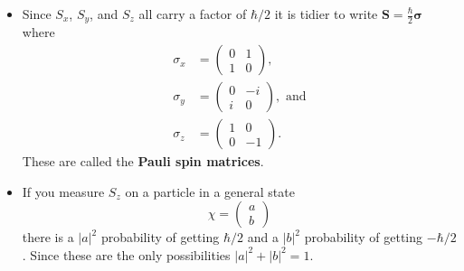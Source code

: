 \documentclass{article}
\renewcommand{\vec}[1]{\boldsymbol{\mathbf{#1}}}
\begin{document}
\begin{itemize}
  \item Since $S_x$, $S_y$, and $S_z$ all carry a factor of $\hbar / 2$ it is tidier to write $\vec{S} = \frac{\hbar}{2} \vec{\sigma}$ where \begin{align*}
          \sigma_x & = \begin{pmatrix}
                         0 & 1 \\
                         1 & 0
                       \end{pmatrix},             \\
          \sigma_y & = \begin{pmatrix}
                         0 & -i \\
                         i & 0
                       \end{pmatrix}, \text{ and} \\
          \sigma_z & = \begin{pmatrix}
                         1 & 0  \\
                         0 & -1
                       \end{pmatrix}.
        \end{align*} These are called the \textbf{Pauli spin matrices}.

  \item If you measure $S_z$ on a particle in a general state \[\chi = \begin{pmatrix}
            a \\
            b
          \end{pmatrix}\] there is a $|a|^2$ probability of getting $\hbar / 2$ and a $|b|^2$ probability of getting $-\hbar / 2$. Since these are the only possibilities $|a|^2 + |b|^2 = 1$.


\end{itemize}
\end{document}
